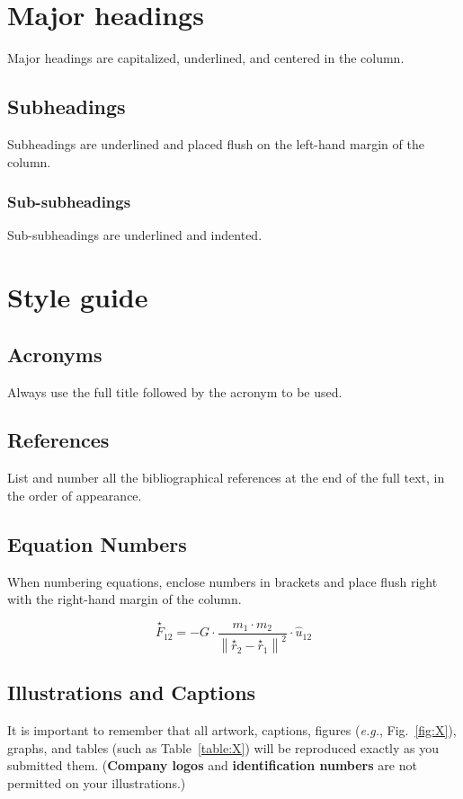 \documentclass[]{iac}
\begin{document}
\maketitle

\section{Major headings}
Major headings are capitalized, underlined, and centered in the column.

\subsection{Subheadings}
Subheadings are underlined and placed flush on the left-hand margin of the column.

\subsubsection{Sub-subheadings}
Sub-subheadings are underlined and indented.

\section{Style guide}

\subsection{Acronyms}
Always use the full title followed by the acronym to be used.

\subsection{References}
List and number all the bibliographical references at the end of the full text, in the order of appearance.

\subsection{Equation Numbers}
When numbering equations, enclose numbers in brackets and place flush right with the right-hand margin of the column.

\begin{equation}
\stackrel{\star}{F}_{12} = -G \cdot \frac{ m_1 \cdot m_2 }{ \left\|\stackrel{\star}{r}_2 - \stackrel{\star}{r}_1\right\|^2 } \cdot \hat{u}_{12}
\end{equation}

\subsection{Illustrations and Captions}
It is important to remember that all artwork, captions, figures (\textit{e.g.}, Fig.~\ref{fig:X}), graphs, and tables (such as Table~\ref{table:X}) will be reproduced exactly as you submitted them. (\textbf{Company logos} and \textbf{identification numbers} are not permitted on your illustrations.)
\end{document}
